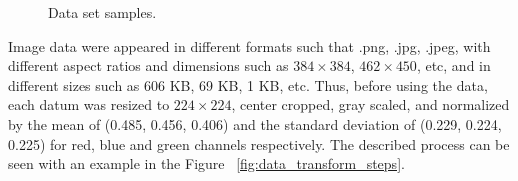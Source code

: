 \begin{figure}[h]
	\centering
	\caption{Data set samples.}
	\label{fig:dataset_samples}
\end{figure}

Image data were appeared in different formats such that .png, .jpg, .jpeg, with different aspect ratios and dimensions such as $384 \times 384$, $462 \times 450$, etc, and in different sizes such as 606 KB, 69 KB, 1 KB, etc. Thus, before using the data, each datum was resized to $224 \times 224$, center cropped, gray scaled, and normalized by the mean of (0.485, 0.456, 0.406) and the standard deviation of (0.229, 0.224, 0.225) for red, blue and green channels respectively. The described process can be seen with an example in the Figure ~\ref{fig:data_transform_steps}. 


